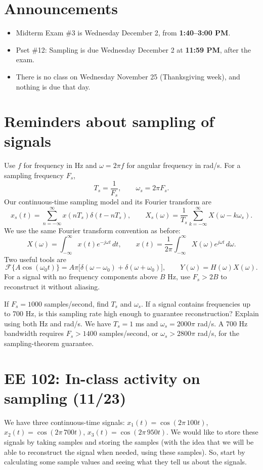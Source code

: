 \section{Announcements}
\begin{itemize}
    \item Midterm Exam \#3 is Wednesday December 2, from
    \textbf{1:40--3:00 PM}.
    \item Pset \#12: Sampling is due Wednesday December 2 at
    \textbf{11:59 PM}, after the exam.
    \item There is no class on Wednesday November 25 (Thanksgiving week),
    and nothing is due that day.
\end{itemize}

\section{Reminders about sampling of signals}
Use $f$ for frequency in Hz and $\omega=2\pi f$ for angular frequency in rad/s.
For a sampling frequency $F_s$,
\[
T_s=\frac{1}{F_s},\qquad \omega_s=2\pi F_s.
\]
Our continuous-time sampling model and its Fourier transform are
\[
x_s(t)=\sum_{n=-\infty}^{\infty}x(nT_s)\delta(t-nT_s),
\qquad
X_s(\omega)=\frac{1}{T_s}\sum_{k=-\infty}^{\infty}
X(\omega-k\omega_s).
\]
We use the same Fourier transform convention as before:
\[
X(\omega)=\int_{-\infty}^{\infty}x(t)e^{-j\omega t}\,dt,
\qquad
x(t)=\frac{1}{2\pi}\int_{-\infty}^{\infty}X(\omega)e^{j\omega t}\,d\omega.
\]
Two useful tools are
\[
\mathcal{F}\{A\cos(\omega_0t)\}
=A\pi\big[\delta(\omega-\omega_0)+\delta(\omega+\omega_0)\big],
\qquad Y(\omega)=H(\omega)X(\omega).
\]
For a signal with no frequency components above $B$ Hz, use $F_s>2B$
to reconstruct it without aliasing.

\begin{popquiz}
If $F_s=1000$ samples/second, find $T_s$ and $\omega_s$.
If a signal contains frequencies up to 700 Hz, is this sampling rate high
enough to guarantee reconstruction? Explain using both Hz and rad/s.
\popqsplit
We have $T_s=1$ ms and $\omega_s=2000\pi$ rad/s.
A 700 Hz bandwidth requires $F_s>1400$ samples/second, or
$\omega_s>2800\pi$ rad/s, for the sampling-theorem guarantee.
\end{popquiz}

\clearpage

\section*{EE 102: In-class activity on sampling (11/23)}
We have three continuous-time signals: $x_1(t)=\cos(2\pi\,100t)$,  $x_2(t)=\cos(2\pi\,700t)$, $x_3(t)=\cos(2\pi\,950t)$.
We would like to store these signals by taking samples and storing the samples (with the idea that we will be able to reconstruct the signal when needed, using these samples). So, start by calculating some sample values and seeing what they tell us about the signals.

